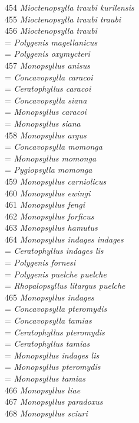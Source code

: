 \documentclass[
]{article}
\begin{document}
454 \emph{Mioctenopsylla traubi kurilensis}\\
455 \emph{Mioctenopsylla traubi traubi}\\
456 \emph{Mioctenopsylla traubi}\\
= \emph{Polygenis magellanicus}\\
= \emph{Polygenis oxymycteri}\\
457 \emph{Monopsyllus anisus}\\
= \emph{Concavopsylla caracoi}\\
= \emph{Ceratophyllus caracoi}\\
= \emph{Concavopsylla siana}\\
= \emph{Monopsyllus caracoi}\\
= \emph{Monopsyllus siana}\\
458 \emph{Monopsyllus argus}\\
= \emph{Concavopsylla momonga}\\
= \emph{Monopsyllus momonga}\\
= \emph{Pygiopsylla momonga}\\
459 \emph{Monopsyllus carniolicus}\\
460 \emph{Monopsyllus ewingi}\\
461 \emph{Monopsyllus fengi}\\
462 \emph{Monopsyllus forficus}\\
463 \emph{Monopsyllus hamutus}\\
464 \emph{Monopsyllus indages indages}\\
= \emph{Ceratophyllus indages lis}\\
= \emph{Polygenis fornesi}\\
= \emph{Polygenis puelche puelche}\\
= \emph{Rhopalopsyllus litargus puelche}\\
465 \emph{Monopsyllus indages}\\
= \emph{Concavopsylla pteromydis}\\
= \emph{Concavopsylla tamias}\\
= \emph{Ceratophyllus pteromydis}\\
= \emph{Ceratophyllus tamias}\\
= \emph{Monopsyllus indages lis}\\
= \emph{Monopsyllus pteromydis}\\
= \emph{Monopsyllus tamias}\\
466 \emph{Monopsyllus liae}\\
467 \emph{Monopsyllus paradoxus}\\
468 \emph{Monopsyllus sciuri}\\
\end{document}
